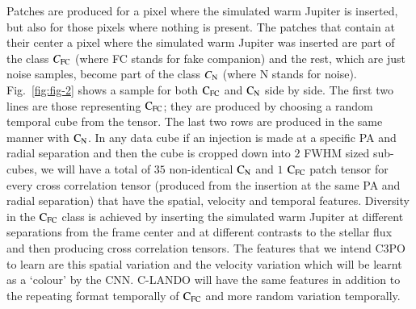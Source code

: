 \documentclass{aa}
\begin{document}
Patches are produced for a pixel where the simulated warm Jupiter is inserted, but also for those pixels where nothing is present.
The patches that contain at their center a pixel where the simulated warm Jupiter was inserted are part of the class $C_{\rm{FC}}$ (where FC stands for fake companion) and the rest, which are just noise samples, become part of the class $C_{\rm{N}}$ (where N stands for noise).
Fig.~\ref{fig:fig-2} shows a sample for both $\rm{C_{FC}}$ and $\rm{C_N}$ side by side.
The first two lines are those representing $\rm{C_{FC}}$; they are produced by choosing a random temporal cube from the tensor.
The last two rows are produced in the same manner with $\rm{C_N}$.
In any data cube if an injection is made at a specific PA and radial separation and then the cube is cropped down into $2$ FWHM sized sub-cubes, we will have a total of $35$ non-identical $\rm{C_N}$ and $1$ $\rm{C_{FC}}$ patch tensor for every cross correlation tensor (produced from the insertion at the same PA and radial separation) that have the spatial, velocity and temporal features. 
Diversity in the $\rm{C_{FC}}$ class is achieved by inserting the simulated warm Jupiter at different separations from the frame center and at different contrasts to the stellar flux and then producing cross correlation tensors.
The features that we intend C3PO to learn are this spatial variation and the velocity variation which will be learnt as a ‘colour’ by the CNN. 
C-LANDO will have the same features in addition to the repeating format temporally of $\rm{C_{FC}}$ and more random variation temporally.
\end{document}
